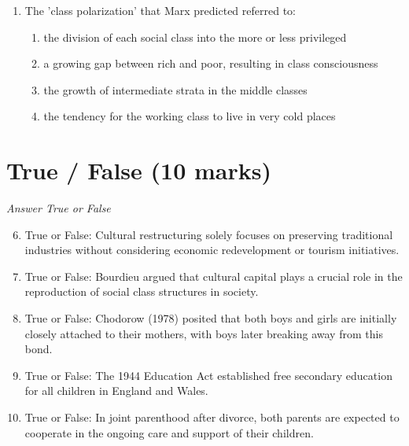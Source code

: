 \documentclass[12pt]{article}
\begin{document}
\begin{enumerate}[label=\arabic*.]
\begin{enumerate}[label=(\alph*)]
    \item content analysis is the best way to identify the themes covered by the media
    \item audiences passively absorb whatever messages they are given
    \item social interaction reinforces the ideas and images that audiences select
\end{enumerate}
\item The 'class polarization' that Marx predicted referred to:
\begin{enumerate}[label=(\alph*)]
    \item the division of each social class into the more or less privileged
    \item a growing gap between rich and poor, resulting in class consciousness
    \item the growth of intermediate strata in the middle classes
    \item the tendency for the working class to live in very cold places
\end{enumerate}
\end{enumerate}

\section*{True / False (10 marks)}
\textit{Answer True or False}
\begin{enumerate}[label=\arabic*.]
\setcounter{enumi}{5}
\item True or False: Cultural restructuring solely focuses on preserving traditional industries without considering economic redevelopment or tourism initiatives.
\item True or False: Bourdieu argued that cultural capital plays a crucial role in the reproduction of social class structures in society.
\item True or False: Chodorow (1978) posited that both boys and girls are initially closely attached to their mothers, with boys later breaking away from this bond.
\item True or False: The 1944 Education Act established free secondary education for all children in England and Wales.
\item True or False: In joint parenthood after divorce, both parents are expected to cooperate in the ongoing care and support of their children.
\end{enumerate}
\end{document}
